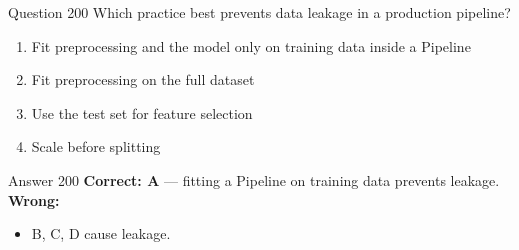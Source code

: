 \documentclass[aspectratio=169,11pt]{beamer}
\begin{document}
	\begin{frame}{Question 200}
		Which practice best prevents data leakage in a production pipeline?
		\begin{enumerate}[label=\Alph*.]
			\item Fit preprocessing and the model only on training data inside a Pipeline
			\item Fit preprocessing on the full dataset
			\item Use the test set for feature selection
			\item Scale before splitting
		\end{enumerate}
	\end{frame}
	\begin{frame}{Answer 200}
		\textbf{Correct: A} --- fitting a Pipeline on training data prevents leakage.\\
		\vspace{0.5em}
		\textbf{Wrong:}
		\begin{itemize}
			\item B, C, D cause leakage.
		\end{itemize}
	\end{frame}
	
\end{document}
